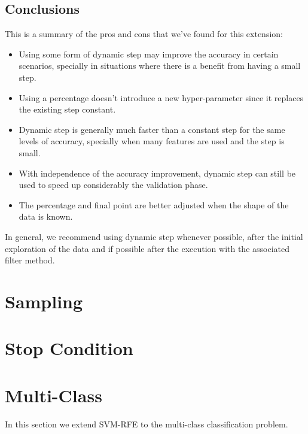 \subsection{Conclusions}

This is a summary of the pros and cons that we've found for this extension:

\begin{itemize}
    \item Using some form of dynamic step may improve the accuracy in certain sce\-nar\-ios, specially in situations where there is a benefit from having a small step.
    \item Using a percentage doesn't introduce a new hyper-parameter since it replaces the existing step constant.
    \item Dynamic step is generally much faster than a constant step for the same levels of accuracy, specially when many features are used and the step is small.
    \item With independence of the accuracy improvement, dynamic step can still be used to speed up considerably the validation phase.
    \item The percentage and final point are better adjusted when the shape of the data is known.
\end{itemize}

In general, we recommend using dynamic step whenever possible, after the initial exploration of the data and if possible after the execution with the associated filter method.


\section{Sampling}

\section{Stop Condition}


\section{Multi-Class}

In this section we extend SVM-RFE to the multi-class classification problem.

